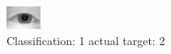 \begin{figure}[h!]
\begin{center}
\includegraphics[width=0.60\columnwidth]{figures/ID1016_class_1_target_2.png}
\end{center}
\caption{ Classification: 1 actual target: 2}
\label{fig:ID1016_class_1_target_2}
\end{figure}
